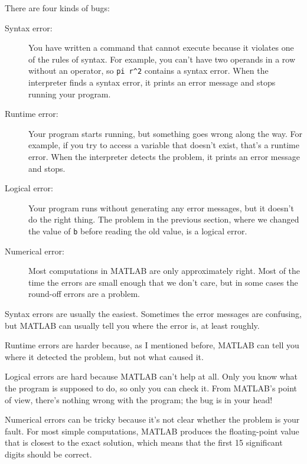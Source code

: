 \documentclass[
]{book}
\numberwithin{Answer}{chapter}
\numberwithin{Exercise}{chapter}
\begin{document}
There are four kinds of bugs:

\begin{description}

\item[Syntax error:] You have written a command that cannot
execute because it violates one of the rules of syntax.  For example,
you can't have two operands in a row without an operator, so
\verb+pi r^2+ contains a syntax error.  When the interpreter finds a syntax
error, it prints an error message and stops running your program.

\item[Runtime error:] Your program starts running, but something goes
wrong along the way.  For example, if you try to access a variable
that doesn't exist, that's a runtime error.  When the interpreter detects the
problem, it prints an error message and stops.

\item[Logical error:] Your program runs without generating any error
messages, but it doesn't do the right thing.  The problem in the
previous section, where we changed the value of {\tt b} before
reading the old value, is a logical error.

\item[Numerical error:] Most computations in MATLAB are only
approximately right.  Most of the time the errors are small enough
that we don't care, but in some cases the round-off errors are a problem.

\end{description}

Syntax errors are usually the easiest.  Sometimes the error messages
are confusing, but MATLAB can usually tell you where the error is, at
least roughly.

Runtime errors are harder because, as I mentioned before, MATLAB
can tell you where it detected the problem, but not what caused it.

Logical errors are hard because MATLAB can't help at all.  Only you
know what the program is supposed to do, so only you can check it.
From MATLAB's point of view, there's nothing wrong with the program;
the bug is in your head!

Numerical errors can be tricky because it's not clear whether the
problem is your fault.  For most simple computations, MATLAB produces
the floating-point value that is closest to the exact solution, which
means that the first 15 significant digits should be correct.  
\end{document}
